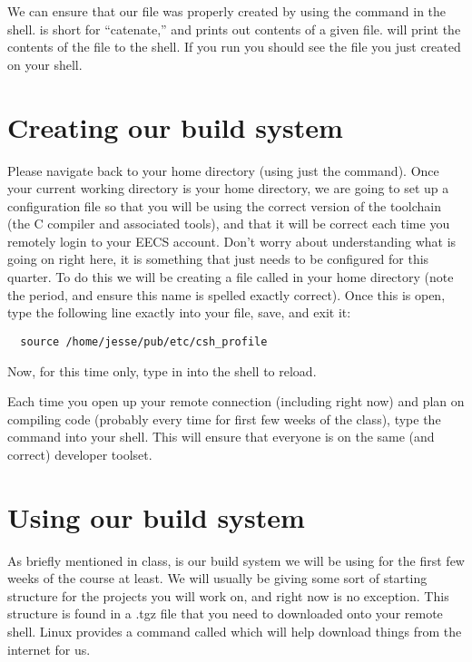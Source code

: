 \documentclass{tufte-handout}
\begin{document}
We can ensure that our file was properly created by using the
 command in the shell.  is short for
``catenate,'' and prints out contents of a given file.   will print the contents of the file to the shell. If
you run  you should see the file you just
created on your shell.

\section{Creating our build system}

Please navigate back to your home directory (using just the 
command). Once your current working directory is your home directory, we
are going to set up a configuration file so that you will be using the
correct version of the toolchain (the C compiler and associated tools),
and that it will be correct each time you remotely login to your EECS
account. Don't worry about understanding what is going on right here, it
is something that just needs to be configured for this quarter. To do
this we will be creating a file called  in your home
directory (note the period, and ensure this name is spelled exactly
correct). Once this is open, type
the following line exactly into your file, save, and exit it:

\begin{verbatim}
  source /home/jesse/pub/etc/csh_profile
\end{verbatim}

Now, for this time only, type in  into the shell to
reload.

Each time you open up your remote connection (including right now) and
plan on compiling code (probably every time for first few weeks of the
class), type the  command into your shell.  This will
ensure that everyone is on the same (and correct) developer toolset.

\section{Using our build system}

As briefly mentioned in class,  is our build system we
will be using for the first few weeks of the course at least.  We will
usually be giving some sort of starting structure for the projects you
will work on, and right now is no exception.  This structure is found in
a .tgz
file that you need to downloaded onto your remote shell.
Linux provides a command called  which will help download
things from the internet for us.
\end{document}
